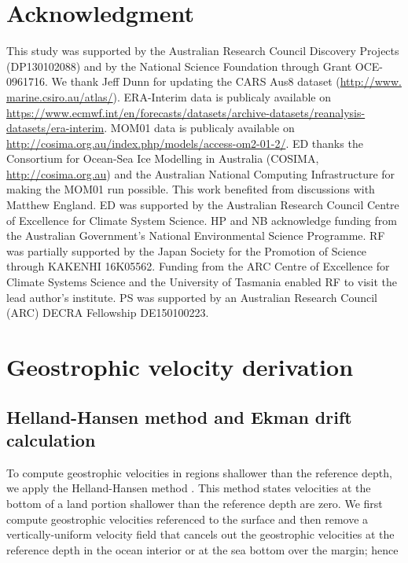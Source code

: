 \documentclass[preprint,3p,review,12pt]{elsarticle}
\begin{document}
\section{Acknowledgment}
This study was supported by the Australian Research Council Discovery Projects (DP130102088) and by the National Science Foundation through Grant OCE-0961716. We thank Jeff Dunn for updating the CARS Aus8 dataset (\url{http://www. marine.csiro.au/atlas/}). ERA-Interim data is publicaly available on \url{https://www.ecmwf.int/en/forecasts/datasets/archive-datasets/reanalysis-datasets/era-interim}. MOM01 data is publicaly available on \url{http://cosima.org.au/index.php/models/access-om2-01-2/}. ED thanks the Consortium for Ocean-Sea Ice Modelling in Australia (COSIMA, \url{http://cosima.org.au}) and the Australian National Computing Infrastructure for making the MOM01 run possible. This work benefited from discussions with Matthew England. ED was supported by the Australian Research Council Centre of Excellence for Climate System Science. HP and NB acknowledge funding from the Australian Government's National Environmental Science Programme. RF was partially supported by the Japan Society for the Promotion of Science through KAKENHI 16K05562.
Funding
  from the ARC Centre of Excellence for Climate Systems Science
  and the University of Tasmania enabled RF to visit the lead author's
  institute.
PS was supported by an Australian Research Council (ARC) DECRA Fellowship DE150100223.

\appendix
\setcounter{figure}{0}

\section{Geostrophic velocity derivation} \label{Geostrophic velocity derivation appendix}
\subsection{Helland-Hansen method and Ekman drift calculation} \label{Helland-Hansen method}
To compute geostrophic velocities in regions shallower than the reference depth, we apply the Helland-Hansen method \citep{Helland-Hansen1934,Fomin1964}. This method states velocities at the bottom of a land portion shallower than the reference depth are zero. We first compute geostrophic velocities referenced to the surface and then remove a vertically-uniform velocity field that cancels out the geostrophic velocities at the reference depth in the ocean interior or at the sea bottom over the margin; hence
\end{document}
